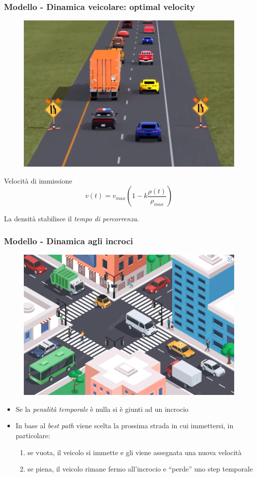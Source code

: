 \documentclass[11pt,]{beamer}
\begin{document}
\begin{frame}
	\frametitle{Modello - Dinamica veicolare: optimal velocity}
	\begin{figure}
		\includegraphics[width=.33\textwidth]{cars.jpg}
	\end{figure}
	\begin{block}{Velocit\`a di immissione}
		\begin{equation*}
			v(t) = v_{max}\left(1-k\frac{\rho(t)}{\rho_{max}}\right)
		\end{equation*}
	\end{block}
	\vspace{10mm}
	La densit\`a stabilisce il \emph{tempo di percorrenza}.	
\end{frame}

\begin{frame}
	\frametitle{Modello - Dinamica agli incroci}
	\begin{figure}
		\includegraphics[width=.4\textwidth]{intersection.png}
	\end{figure}
	\begin{itemize}
		\item Se la \emph{penalit\`a temporale} \`e nulla si \`e giunti ad un incrocio
		\item In base al \emph{best path} viene scelta la prossima strada in cui immettersi, in particolare:
			\begin{enumerate}
				\item se vuota, il veicolo si immette e gli viene assegnata una nuova velocit\`a
				\item se piena, il veicolo rimane fermo all'incrocio e ``perde'' uno step temporale
			\end{enumerate}
	\end{itemize}
	
\end{frame}
\end{document}
